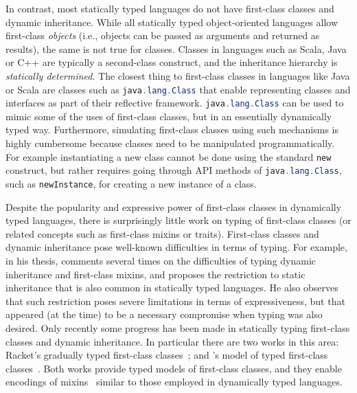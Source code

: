In contrast, most statically typed
languages do not have first-class classes and dynamic
inheritance. While all statically typed object-oriented languages allow first-class
\emph{objects} (i.e., objects can be passed as arguments and returned
as results), the same is not true for classes. Classes in languages such as
Scala, Java or C++ are typically a second-class construct, and the
inheritance hierarchy is \emph{statically determined}. The closest thing
to first-class classes in
languages like Java or Scala are classes such as
\lstinline[language=java]{java.lang.Class} that enable representing classes and
interfaces as part of their reflective framework. \lstinline[language=java]{java.lang.Class} can be used to
mimic some of the uses of first-class classes, but in an essentially
dynamically typed way. Furthermore, simulating first-class classes
using such mechanisms is highly cumbersome because classes need to be
manipulated programmatically. For example instantiating a new class
cannot be done using the standard \lstinline{new} construct, but
rather requires going through API methods of
\lstinline[language=java]{java.lang.Class}, such as \lstinline{newInstance}, for
creating a new instance of a class.

Despite the popularity and expressive power of first-class classes in dynamically typed
languages, there is surprisingly little work on typing of first-class
classes (or related concepts such as first-class mixins or traits).
First-class classes and dynamic inheritance pose well-known
difficulties in terms of typing. For example, in his thesis,
\citet{bracha1992programming} comments several times on the difficulties of typing
dynamic inheritance and first-class mixins, and proposes the
restriction to static inheritance that is also common in
statically typed languages. He also observes that such restriction
poses severe limitations in terms of expressiveness, but that appeared
(at the time)
to be a necessary compromise when typing was also desired.
Only recently some progress has been made in statically typing
first-class classes and dynamic inheritance. In particular there are
two works in this area: Racket's gradually
typed first-class classes~\citep{DBLP:conf/oopsla/TakikawaSDTF12}; and \citeauthor{DBLP:conf/ecoop/LeeASP15}'s model of
typed first-class classes~\citep{DBLP:conf/ecoop/LeeASP15}. Both works provide typed models of
first-class classes, and they enable encodings of mixins~\citep{bracha1990mixin}
similar to those employed in dynamically typed languages.

